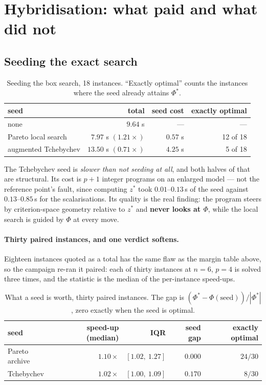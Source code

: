 \documentclass[11pt,a4paper]{article}
\begin{document}
\section{Hybridisation: what paid and what did not}

\subsection{Seeding the exact search}

\begin{table}[h]
\centering
\caption{Seeding the box search, 18 instances.  ``Exactly optimal'' counts the
instances where the seed already attains $\Phi^{*}$.}
\begin{tabular}{lrrr}
\toprule
seed & total & seed cost & exactly optimal \\
\midrule
none                   & $9.64$ s  & ---      & --- \\
Pareto local search    & $\mathbf{7.97}$ s $(1.21\times)$ & $0.57$ s & 12 of 18 \\
augmented Tchebychev   & $13.50$ s $(0.71\times)$ & $4.25$ s & 5 of 18 \\
\bottomrule
\end{tabular}
\end{table}

\begin{center}\end{center}

\noindent
The Tchebychev seed is \emph{slower than not seeding at all}, and both halves
of that are structural.  Its cost is $p+1$ integer programs on an enlarged
model --- not the reference point's fault, since computing $z^{*}$ took
$0.01$--$0.13$\,s of the seed against $0.13$--$0.85$\,s for the scalarisations.
Its quality is the real finding: the program steers by criterion-space geometry
relative to $z^{*}$ and \textbf{never looks at $\Phi$}, while the local search
is guided by $\Phi$ at every move.

\paragraph{Thirty paired instances, and one verdict softens.}  Eighteen
instances quoted as a total has the same flaw as the margin table above, so the
campaign re-ran it paired: each of thirty instances at $n=6$, $p=4$ is solved
three times, and the statistic is the median of the per-instance speed-ups.

\begin{table}[h]
\centering
\caption{What a seed is worth, thirty paired instances.  The gap is
$(\Phi^{*}-\Phi(\text{seed}))/|\Phi^{*}|$, zero exactly when the seed is
optimal.}
\begin{tabular}{lrrrr}
\toprule
seed & speed-up (median) & IQR & seed gap & exactly optimal \\
\midrule
Pareto archive & $1.10\times$ & $[1.02,\ 1.27]$ & $0.000$ & $24/30$ \\
Tchebychev     & $1.02\times$ & $[1.00,\ 1.09]$ & $0.170$ & $8/30$ \\
\bottomrule
\end{tabular}
\end{table}
\end{document}
